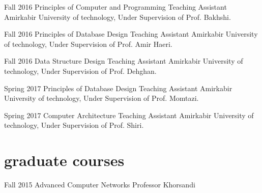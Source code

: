 \documentclass[]{friggeri-cv} %
\begin{document}
\begin{entrylist}
	\entry
	{Fall 2016}
	{Principles of Computer and Programming}
	{Teaching Assistant}
	{Amirkabir University of technology, Under Supervision of Prof. Bakhshi.}


	\entry
	{Fall 2016}
	{Principles of Database Design}
	{Teaching Assistant}
	{Amirkabir University of technology, Under Supervision of Prof. Amir Haeri.}

	
	\entry
	{Fall 2016}
	{Data Structure Design}
	{Teaching Assistant}
	{Amirkabir University of technology, Under Supervision of Prof. Dehghan.}

	
	\entry
	{Spring 2017}
	{Principles of Database Design}
	{Teaching Assistant}
	{Amirkabir University of technology, Under Supervision of Prof. Momtazi.}


	\entry
	{Spring 2017}
	{Computer Architecture}
	{Teaching Assistant}
	{Amirkabir University of technology, Under Supervision of Prof. Shiri.}


\end{entrylist}


\section{graduate courses}

\begin{entrylist}

	\entry
	{Fall 2015}
	{Advanced Computer Networks}
	{Professor Khorsandi}
	{}


\end{entrylist}

\end{document}
